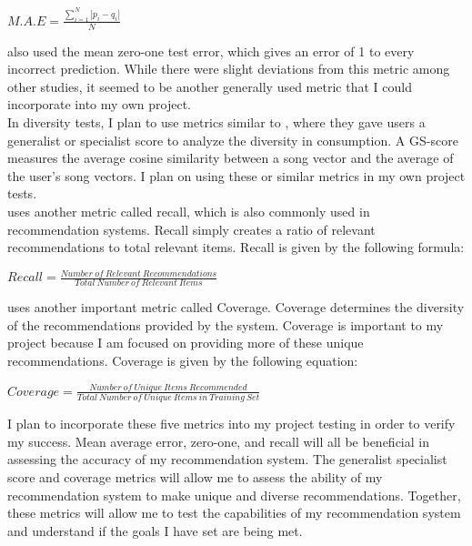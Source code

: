 \documentclass[10pt,twocolumn]{article}
\begin{document}
\begin{center}
\begin{math}
    M.A.E = \frac{\sum_{i=1}^{N} |p_{i}-q_{i}|}{N}
\end{math}
\end{center}

\indent \textcite{SarwarItemCF} also used the mean zero-one test error, which gives an error of 1 to every incorrect prediction. While there were slight deviations from this metric among other studies, it seemed to be another generally used metric that I could incorporate into my own project.\\

\indent In diversity tests, I plan to use metrics similar to \cite{AndersonDiversity}, where they gave users a generalist or specialist score to analyze the diversity in consumption. A GS-score measures the average cosine similarity between a song vector and the average of the user's song vectors. I plan on using these or similar metrics in my own project tests.\\

\indent \textcite{KidwaiFB} uses another metric called recall, which is also commonly used in recommendation systems. Recall simply creates a ratio of relevant recommendations to total relevant items. Recall is given by the following formula:
\begin{center}
\begin{math}
    Recall = \frac{Number\ of\ Relevant\ Recommendations}{Total\ Number\ of\ Relevant\ Items}
\end{math}
\end{center}

\indent \textcite{KidwaiFB} uses another important metric called Coverage. Coverage determines the diversity of the recommendations provided by the system. Coverage is important to my project because I am focused on providing more of these unique recommendations. Coverage is given by the following equation:
\begin{center}
\begin{math}
    Coverage = \frac{Number\ of\ Unique\ Items\ Recommended}{Total\ Number\ of\ Unique\ Items\ in\ Training\ Set}
\end{math}
\end{center}

\indent I plan to incorporate these five metrics into my project testing in order to verify my success. Mean average error, zero-one, and recall will all be beneficial in assessing the accuracy of my recommendation system. The generalist specialist score and coverage metrics will allow me to assess the ability of my recommendation system to make unique and diverse recommendations. Together, these metrics will allow me to test the capabilities of my recommendation system and understand if the goals I have set are being met. 
\end{document}
